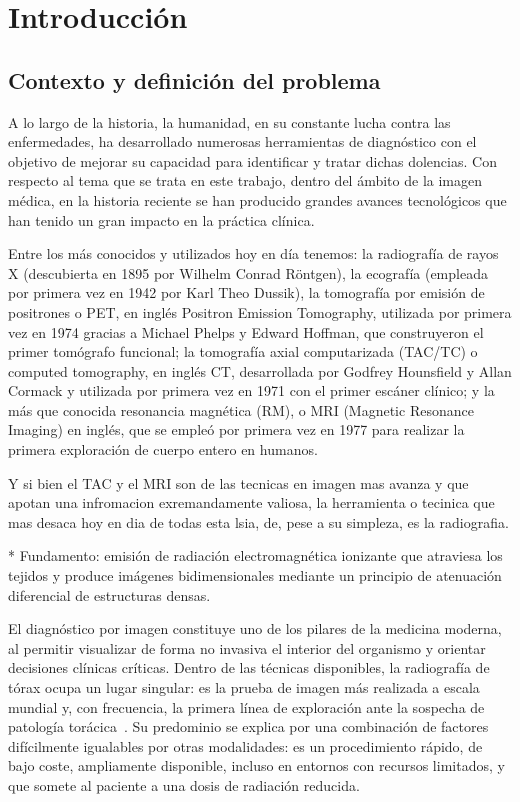 %
\chapter{Introducción}
\label{ch::capitulo1}


\section{Contexto y definición del problema}

A lo largo de la historia, la humanidad, en su constante lucha contra las enfermedades, ha desarrollado numerosas herramientas de diagnóstico con el objetivo de mejorar su capacidad para identificar y tratar dichas dolencias. Con respecto al tema que se trata en este trabajo, dentro del ámbito de la imagen médica, en la historia reciente se han producido grandes avances tecnológicos que han tenido un gran impacto en la práctica clínica.

Entre los más conocidos y utilizados hoy en día tenemos: la radiografía de rayos X (descubierta en 1895 por Wilhelm Conrad Röntgen), la ecografía (empleada por primera vez en 1942 por Karl Theo Dussik), la tomografía por emisión de positrones o PET, en inglés Positron Emission Tomography, utilizada por primera vez en 1974 gracias a Michael Phelps y Edward Hoffman, que construyeron el primer tomógrafo funcional; la tomografía axial computarizada (TAC/TC) o computed tomography, en inglés CT, desarrollada por Godfrey Hounsfield y Allan Cormack y utilizada por primera vez en 1971 con el primer escáner clínico; y la más que conocida resonancia magnética (RM), o MRI (Magnetic Resonance Imaging) en inglés, que se empleó por primera vez en 1977 para realizar la primera exploración de cuerpo entero en humanos.

Y si bien el TAC y el MRI son de las tecnicas en imagen mas avanza y que apotan una infromacion exremandamente valiosa, la herramienta o tecinica que mas desaca hoy en dia de todas esta lsia, de, pese a su simpleza, es la radiografia.


* Fundamento: emisión de radiación electromagnética ionizante que atraviesa los tejidos y produce imágenes bidimensionales mediante un principio de atenuación diferencial de estructuras densas.



El diagnóstico por imagen constituye uno de los pilares de la medicina moderna,
al permitir visualizar de forma no invasiva el interior del organismo y orientar
decisiones clínicas críticas. Dentro de las técnicas disponibles, la radiografía
de tórax ocupa un lugar singular: es la prueba de imagen más realizada a escala
mundial y, con frecuencia, la primera línea de exploración ante la sospecha de
patología torácica~\cite{irvinCheXpertLargeChest2019, lizDeepLearningMultilabel2023}.
Su predominio se explica por una combinación de factores difícilmente igualables
por otras modalidades: es un procedimiento rápido, de bajo coste, ampliamente
disponible, incluso en entornos con recursos limitados, y que somete al paciente
a una dosis de radiación reducida.

